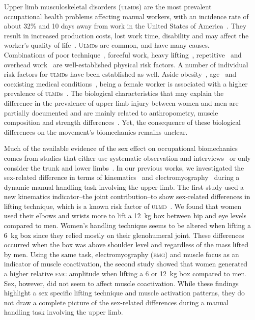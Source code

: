 Upper limb musculoskeletal disorders (\textsc{ulmd}s) are the most prevalent occupational health problems affecting manual workers, with an incidence rate of about 32\% and 10 days away from work in the United States of America~\cite{Bureau_of_Labor_Statistics2015-jt,Luime2004-wt, Urwin1998-op}.
They result in increased production costs, lost work time, disability and may affect the worker’s quality of life~\cite{Eva1992-qg, Kuijpers2004-ue, Palmer2012-yc, Pope2001-ph}.
\textsc{Ulmd}s are common, and have many causes.
Combinations of poor technique~\cite{Miranda2008-gq}, forceful work, heavy lifting~\cite{Beach2012-yn}, repetitive~\cite{Harkness2003-qz} and overhead work~\cite{Leclerc2004-pd} are well-established physical risk factors.
A number of individual risk factors for \textsc{ulmd}s have been established as well.
Aside obesity~\cite{Luime2004-wt}, age~\cite{Boocock2015-ce} and coexisting medical conditions~\cite{Walker-Bone2005-dx}, being a female worker is associated with a higher prevalence of \textsc{ulmd}s~\cite{Hooftman2009-bk, Miranda2008-gq, Treaster2004-rr, Wahlstedt2010-wk}.
The biological characteristics that may explain the difference in the prevalence of upper limb injury between women and men are partially documented and are mainly related to anthropometry, muscle composition and strength differences~\cite{Cote2012-hn}.
Yet, the consequence of these biological differences on the movement's biomechanics remains unclear.

Much of the available evidence of the sex effect on occupational biomechanics comes from studies that either use systematic observation and interviews~\cite{Dahlberg2004-mw} or only consider the trunk and lower limbs~\cite{Lindbeck2001-fq, Plamondon2014-xe, Plamondon2017-qa}.
In our previous works, we investigated the sex-related difference in terms of kinematics~\cite{Martinez2019-mm} and electromyography~\cite{Bouffard2019-fd} during a dynamic manual handling task involving the upper limb.
The first study used a new kinematics indicator--the joint contribution--to show sex-related differences in lifting technique, which is a known risk factor of \textsc{ulmd}~\cite{Kilbom1998-la}.
We found that women used their elbows and wrists more to lift a 12~kg box between hip and eye levels compared to men.
Women’s handling technique seems to be altered when lifting a 6~kg box since they relied mostly on their glenohumeral joint.
These differences occurred when the box was above shoulder level and regardless of the mass lifted by men.
Using the same task, electromyography (\textsc{emg}) and muscle focus as an indicator of muscle coactivation, the second study showed that women generated a higher relative \textsc{emg} amplitude when lifting a 6 or 12~kg box compared to men.
Sex, however, did not seem to affect muscle coactivation.
While these findings highlight a sex specific lifting technique and muscle activation patterns, they do not draw a complete picture of the sex-related differences during a manual handling task involving the upper limb.

